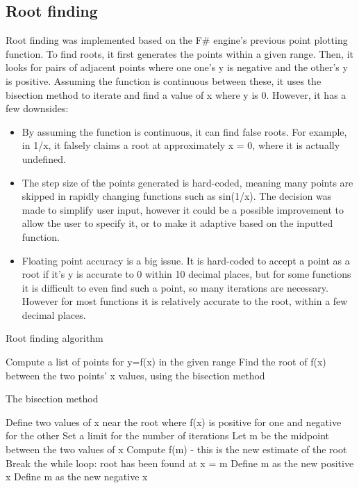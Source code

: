 \documentclass[a4paper, oneside, 11pt]{report}
\begin{document}
\subsection{Root finding}
Root finding was implemented based on the F\# engine's previous point plotting function. To find roots, it first generates the points within a given range. Then, it looks for pairs of adjacent points where one one's y is negative and the other's y is positive. Assuming the function is continuous between these, it uses the bisection method to iterate and find a value of x where y is 0. However, it has a few downsides:
\begin{itemize}
    \item By assuming the function is continuous, it can find false roots. For example, in 1/x, it falsely claims a root at approximately x = 0, where it is actually undefined.
    \item The step size of the points generated is hard-coded, meaning many points are skipped in rapidly changing functions such as sin(1/x). The decision was made to simplify user input, however it could be a possible improvement to allow the user to specify it, or to make it adaptive based on the inputted function.
    \item Floating point accuracy is a big issue. It is hard-coded to accept a point as a root if it's y is accurate to 0 within 10 decimal places, but for some functions it is difficult to even find such a point, so many iterations are necessary. However for most functions it is relatively accurate to the root, within a few decimal places.
\end{itemize}

\begin{algorithm}[th]
\caption{ Root finding algorithm }
\begin{algorithmic}[1]
\STATE Compute a list of points for y=f(x) in the given range
        \STATE Find the root of f(x) between the two points' x values, using the bisection method
    \ENDIF
\ENDFOR
\end{algorithmic}
\end{algorithm}

\begin{algorithm}[th]
\caption{ The bisection method }
\begin{algorithmic}[1]
\STATE Define two values of x near the root where f(x) is positive for one and negative for the other
\STATE Set a limit for the number of iterations
	\STATE Let m be the midpoint between the two values of x
    \STATE Compute f(m) - this is the new estimate of the root
        \STATE Break the while loop: root has been found at x = m
        \STATE Define m as the new positive x
        \STATE Define m as the new negative x
    \ENDIF
\ENDWHILE
\end{algorithmic}
\end{algorithm}
\end{document}
